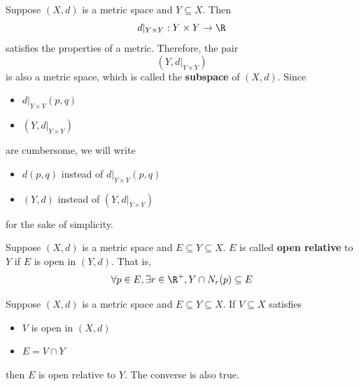 \bigskip

\begin{remark}
  Suppose $(X, d)$ is a metric space and $Y \subseteq X$. Then
  \[
    d|_{Y \times Y}: Y \times Y \to \R
  \]
  satisfies the properties of a metric. Therefore, the pair
  \[
    (Y, d|_{Y \times Y})
  \]
  is also a metric space, which is called the \textbf{subspace} of $(X, d)$. Since
  \begin{itemize}
    \item $d|_{Y \times Y}(p, q)$
    \item $(Y, d|_{Y \times Y})$
  \end{itemize}
  are cumbersome, we will write
  \begin{itemize}
    \item $d(p, q)$ instead of $d|_{Y \times Y}(p, q)$
    \item $(Y, d)$ instead of $(Y, d|_{Y \times Y})$
  \end{itemize}
  for the sake of simplicity.
\end{remark}

\bigskip

\begin{definition} \label{an:def:open-set-relative-to-subspace}
  Suppose $(X, d)$ is a metric space and $E \subseteq Y \subseteq X$. $E$ is called
  \textbf{open relative} to $Y$ if $E$ is open in $(Y, d)$. That is,
  \[
    \forall p \in E, \exists r \in \R^{+},Y \cap N_{r}(p) \subseteq E
  \]
\end{definition}

\bigskip

\begin{theorem} \label{an:thm:open-set-relative-to-subspace}
  Suppose $(X, d)$ is a metric space and $E \subseteq Y \subseteq X$. If $V \subseteq X$ satisfies
  \begin{itemize}
    \item $V$ is open in $(X, d)$
    \item $E = V \cap Y$
  \end{itemize}
  then $E$ is open relative to $Y$. The converse is also true.
\end{theorem}

